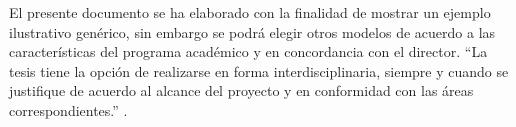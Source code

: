 
El presente documento se ha elaborado con la finalidad de mostrar un ejemplo ilustrativo genérico,
sin embargo se podrá elegir otros modelos de acuerdo a las características del programa académico y
en concordancia con el director. “La tesis tiene la opción de realizarse en forma
interdisciplinaria, siempre y cuando se justifique de acuerdo al alcance del proyecto y en
conformidad con las áreas correspondientes.” \cite{einstein}.
